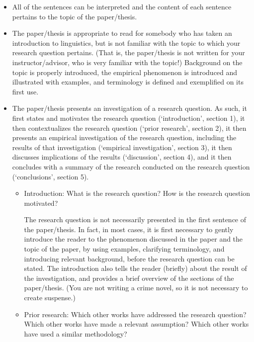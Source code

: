 \documentclass[11pt,fleqn,a4paper/thesis]{article}
\newcommand{\6}{\mbox{$[\hspace*{-.6mm}[$}}
\newcommand{\9}{\mbox{$]\hspace*{-.6mm}]$}}
\begin{document}
\begin{itemize}[itemsep=-1pt,leftmargin=2.5ex,topsep=-2pt]

\item All of the sentences can be interpreted and the content of each sentence pertains to the topic of the paper/thesis.

\item The paper/thesis is appropriate to read for somebody who has taken an introduction to linguistics, but is not familiar with the topic to which your research question pertains. (That is, the paper/thesis is not written for your instructor/advisor, who is very familiar with the topic!) Background on the topic is properly introduced, the empirical phenomenon is introduced and illustrated with examples, and terminology is defined and exemplified on its first use. 

\item The paper/thesis presents an investigation of a research question. As such, it first states and motivates the research question (`introduction', section 1), it then contextualizes the research question (`prior research', section 2), it then presents an empirical investigation of the research question, including the results of that investigation (`empirical investigation', section 3), it then discusses implications of the results (`discussion', section 4), and it then concludes with a summary of the research conducted on the research question (`conclusions', section 5).

\begin{itemize}[leftmargin=2.5ex,topsep=-2pt]

\item Introduction: What is the research question? How is the research question motivated?

The research question is not necessarily presented in the first sentence of the paper/thesis. In fact, in most cases, it is first necessary to gently introduce the reader to the phenomenon discussed in the paper and the topic of the paper, by using examples, clarifying terminology, and introducing relevant background, before the research question can be stated. The introduction also tells the reader (briefly) about the result of the investigation, and provides a brief overview of the sections of the paper/thesis. (You are not writing a crime novel, so it is not necessary to create suspense.)

\item Prior research: Which other works have addressed the research question? Which other works have made a relevant assumption? Which other works have used a similar methodology?


\end{itemize}
\end{itemize}
\end{document}
